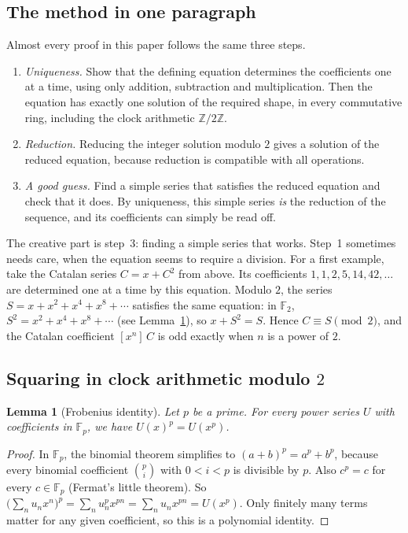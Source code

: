 \documentclass[11pt,a4paper]{article}
\newtheorem{lemma}[theorem]{Lemma}
\theoremstyle{definition}
\theoremstyle{remark}
\newcommand{\Z}{\mathbb{Z}}
\newcommand{\F}{\mathbb{F}}
\newcommand{\coeff}[2]{[x^{#1}]\,#2}
\begin{document}
\subsection{The method in one paragraph}
Almost every proof in this paper follows the same three steps.
\begin{enumerate}
\item \emph{Uniqueness.} Show that the defining equation determines the coefficients one at a time, using only
addition, subtraction and multiplication. Then the equation has exactly one solution of the required shape, in every
commutative ring, including the clock arithmetic $\Z/2\Z$.
\item \emph{Reduction.} Reducing the integer solution modulo $2$ gives a solution of the reduced equation,
because reduction is compatible with all operations.
\item \emph{A good guess.} Find a simple series that satisfies the reduced equation and check that it does. By uniqueness,
this simple series \emph{is} the reduction of the sequence, and its coefficients can simply be read off.
\end{enumerate}
The creative part is step~3: finding a simple series that works. Step~1 sometimes needs care, when the equation seems to
require a division.
For a first example, take the Catalan series $C=x+C^2$ from above. Its coefficients $1,1,2,5,14,42,\dots$ are
determined one at a time by this equation. Modulo $2$, the series $S=x+x^2+x^4+x^8+\cdots$ satisfies the same
equation: in $\F_2$, $S^2=x^2+x^4+x^8+\cdots$ (see Lemma~\ref{lem:frobenius}), so $x+S^2=S$. Hence $C\equiv S\pmod2$,
and the Catalan coefficient $\coeff{n}{C}$ is odd exactly when $n$ is a power of $2$.

\subsection{Squaring in clock arithmetic modulo \texorpdfstring{$2$}{2}}
\begin{lemma}[Frobenius identity]\label{lem:frobenius}
Let $p$ be a prime. For every power series $U$ with coefficients in $\F_p$, we have $U(x)^p=U(x^p)$.
\end{lemma}

\begin{proof}
In $\F_p$, the binomial theorem simplifies to $(a+b)^p=a^p+b^p$, because every binomial coefficient
$\binom pi$ with $0<i<p$ is divisible by $p$. Also $c^p=c$ for every $c\in\F_p$ (Fermat's little theorem). So
$\bigl(\sum_nu_nx^n\bigr)^p=\sum_nu_n^px^{pn}=\sum_nu_nx^{pn}=U(x^p)$. Only finitely many terms matter for any given
coefficient, so this is a polynomial identity.
\end{proof}
\end{document}
